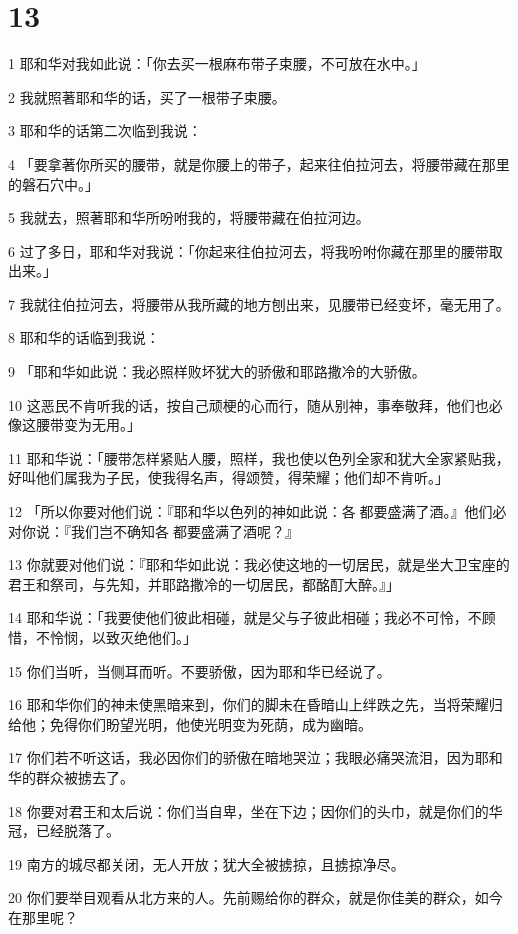 \chapter{13}

\par 1 耶和华对我如此说：「你去买一根麻布带子束腰，不可放在水中。」
\par 2 我就照著耶和华的话，买了一根带子束腰。
\par 3 耶和华的话第二次临到我说：
\par 4 「要拿著你所买的腰带，就是你腰上的带子，起来往伯拉河去，将腰带藏在那里的磐石穴中。」
\par 5 我就去，照著耶和华所吩咐我的，将腰带藏在伯拉河边。
\par 6 过了多日，耶和华对我说：「你起来往伯拉河去，将我吩咐你藏在那里的腰带取出来。」
\par 7 我就往伯拉河去，将腰带从我所藏的地方刨出来，见腰带已经变坏，毫无用了。
\par 8 耶和华的话临到我说：
\par 9 「耶和华如此说：我必照样败坏犹大的骄傲和耶路撒冷的大骄傲。
\par 10 这恶民不肯听我的话，按自己顽梗的心而行，随从别神，事奉敬拜，他们也必像这腰带变为无用。」
\par 11 耶和华说：「腰带怎样紧贴人腰，照样，我也使以色列全家和犹大全家紧贴我，好叫他们属我为子民，使我得名声，得颂赞，得荣耀；他们却不肯听。」
\par 12 「所以你要对他们说：『耶和华以色列的神如此说：各都要盛满了酒。』他们必对你说：『我们岂不确知各都要盛满了酒呢？』
\par 13 你就要对他们说：『耶和华如此说：我必使这地的一切居民，就是坐大卫宝座的君王和祭司，与先知，并耶路撒冷的一切居民，都酩酊大醉。』」
\par 14 耶和华说：「我要使他们彼此相碰，就是父与子彼此相碰；我必不可怜，不顾惜，不怜悯，以致灭绝他们。」
\par 15 你们当听，当侧耳而听。不要骄傲，因为耶和华已经说了。
\par 16 耶和华你们的神未使黑暗来到，你们的脚未在昏暗山上绊跌之先，当将荣耀归给他；免得你们盼望光明，他使光明变为死荫，成为幽暗。
\par 17 你们若不听这话，我必因你们的骄傲在暗地哭泣；我眼必痛哭流泪，因为耶和华的群众被掳去了。
\par 18 你要对君王和太后说：你们当自卑，坐在下边；因你们的头巾，就是你们的华冠，已经脱落了。
\par 19 南方的城尽都关闭，无人开放；犹大全被掳掠，且掳掠净尽。
\par 20 你们要举目观看从北方来的人。先前赐给你的群众，就是你佳美的群众，如今在那里呢？
